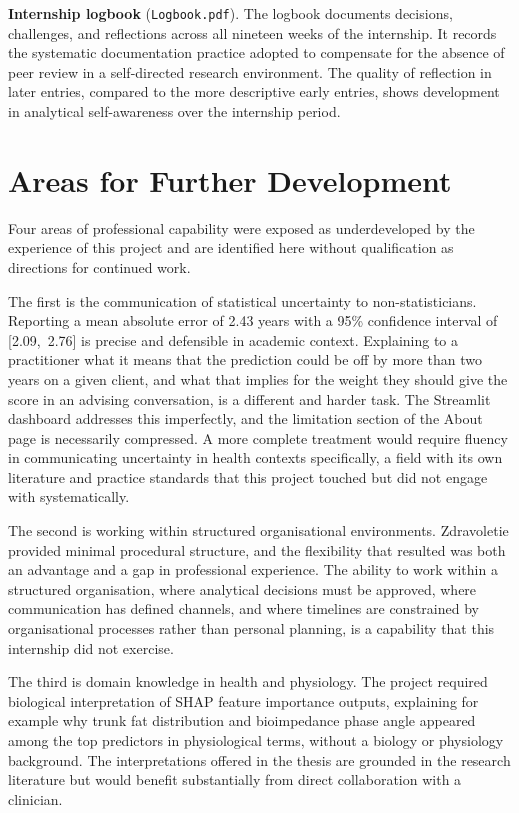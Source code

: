\documentclass[11pt,a4paper]{report}
\begin{document}
\textbf{Internship logbook} (\texttt{Logbook.pdf}). The logbook documents decisions,
challenges, and reflections across all nineteen weeks of the internship. It records the systematic
documentation practice adopted to compensate for the absence of peer review in a self-directed
research environment. The quality of reflection in later entries, compared to the more descriptive
early entries, shows development in analytical self-awareness over the internship period.

\section{Areas for Further Development}

Four areas of professional capability were exposed as underdeveloped by the experience of this
project and are identified here without qualification as directions for continued work.

The first is the communication of statistical uncertainty to non-statisticians. Reporting a mean
absolute error of 2.43 years with a 95\% confidence interval of [2.09,~2.76] is precise and
defensible in academic context. Explaining to a practitioner what it means that the prediction
could be off by more than two years on a given client, and what that implies for the weight they
should give the score in an advising conversation, is a different and harder task. The Streamlit
dashboard addresses this imperfectly, and the limitation section of the About page is necessarily
compressed. A more complete treatment would require fluency in communicating uncertainty in health
contexts specifically, a field with its own literature and practice standards that this project
touched but did not engage with systematically.

The second is working within structured organisational environments. Zdravoletie provided minimal
procedural structure, and the flexibility that resulted was both an advantage and a gap in
professional experience. The ability to work within a structured organisation, where analytical
decisions must be approved, where communication has defined channels, and where timelines are
constrained by organisational processes rather than personal planning, is a capability that this
internship did not exercise.

The third is domain knowledge in health and physiology. The project required biological
interpretation of SHAP feature importance outputs, explaining for example why trunk fat
distribution and bioimpedance phase angle appeared among the top predictors in physiological terms,
without a biology or physiology background. The interpretations offered in the thesis are
grounded in the research literature but would benefit substantially from direct collaboration with
a clinician.
\end{document}
